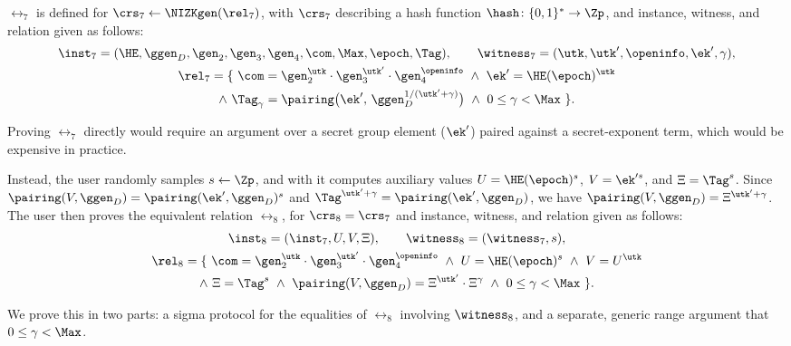 $\rel_7$ is defined for $\crs_7 \leftarrow \NIZKgen(\rel_7)$, with $\crs_7$
describing a hash function $\hash \colon \{0,1\}^* \rightarrow \Zp$, and
instance, witness, and relation given as follows:
%
\begin{equation} \begin{gathered}
%
  \inst_7 = (\HE, \ggen_D, \gen_2, \gen_3, \gen_4, \com, \Max, \epoch, \Tag),
  \qquad \witness_7 = (\utk, \utk', \openinfo, \ek', \gamma), \\
%
  \rel_7 = \{\ \com = \gen_2^{\utk}\cdot\gen_3^{\utk'}\cdot\gen_4^{\openinfo} \
  \wedge \ \ek' = \HE(\epoch)^{\utk} \\ \wedge \ \Tag_{\gamma} =
\pairing\big(\ek',\, \ggen_D^{1/(\utk'+\gamma)}\big) \ \wedge \ 0 \leq \gamma <
\Max\ \}.
%
\end{gathered} \end{equation}
%

Proving $\rel_7$ directly would require an argument over a secret group element
($\ek'$) paired against a secret-exponent term, which would be expensive in
practice.

Instead, the user randomly samples $s \leftarrow \Zp$, and with it computes
auxiliary values $U = \HE(\epoch)^s$, $V = \ek'^{s}$, and $\Xi = \Tag^s$.
Since $\pairing(V,\ggen_D) = \pairing(\ek',\ggen_D)^s$ and $\Tag^{\utk'+\gamma}
= \pairing(\ek',\ggen_D)$, we have $\pairing(V,\ggen_D) = \Xi^{\utk'+\gamma}$.
The user then proves the equivalent relation $\rel_8$, for $\crs_8 = \crs_7$
and instance, witness, and relation given as follows:
%
\begin{equation} \begin{gathered}
%
  \inst_8 = (\inst_7, U, V, \Xi), \qquad \witness_8 = (\witness_7, s), \\
%
  \rel_8 = \{\ \com = \gen_2^{\utk}\cdot\gen_3^{\utk'}\cdot\gen_4^{\openinfo} \
  \wedge \ U = \HE(\epoch)^s \ \wedge \ V = U^{\utk} \\ \wedge \ \Xi = \Tag^s \
\wedge \ \pairing(V,\ggen_D) = \Xi^{\utk'}\cdot\Xi^{\gamma} \ \wedge \ 0 \leq
\gamma < \Max\ \}.
%
\end{gathered} \end{equation}
%

We prove this in two parts: a sigma protocol for the equalities of $\rel_8$
involving $\witness_8$, and a separate, generic range argument that $0 \leq
\gamma < \Max$.

